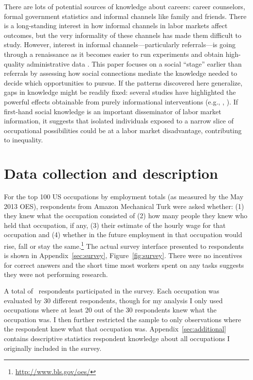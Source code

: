 \documentclass[12pt]{article}
\begin{document}
There are lots of potential sources of knowledge about careers: career counselors, formal government statistics and informal channels like family and friends. 
There is a long-standing interest in how informal channels in labor markets affect outcomes\citep{rees1966information, stigler1962information}, but the very informality of these channels has made them difficult to study. 
However, interest in informal channels---particularly referrals---is going through a renaissance as it becomes easier to run experiments \citep{pallais2013referential} and obtain high-quality administrative data \citep{burks2013value}.   
This paper focuses on a social ``stage'' earlier than referrals by assessing how social connections mediate the knowledge needed to decide which opportunities to pursue.  
If the patterns discovered here generalize, gaps in knowledge might be readily fixed: 
several studies have highlighted the powerful effects obtainable from purely informational interventions (e.g., \cite{dupas2009teenagers}, \cite{card2010inequality}).
If first-hand social knowledge is an important disseminator of labor market information, it suggests that isolated individuals exposed to a narrow slice of occupational possibilities could be at a labor market disadvantage, contributing to inequality. 


\section{Data collection and description} 
For the top 100 US occupations by employment totals (as measured by the May 2013 OES), respondents from Amazon Mechanical Turk were asked whether: 
(1) they knew what the occupation consisted of 
(2) how many people they knew who held that occupation, if any,  
(3) their estimate of the hourly wage for that occupation
and (4) whether in the future employment in that occupation would rise, fall or stay the same.\footnote{\url{http://www.bls.gov/oes/}} 
The actual survey interface presented to respondents is shown in Appendix~\ref{sec:survey}, Figure~\ref{fig:survey}. 
There were no incentives for correct answers and the short time most workers spent on any tasks suggests they were not performing research. 

A total of \numRaters\, respondents participated in the survey. 
Each occupation was evaluated by 30 different respondents, though for my analysis I only used occupations where at least 20 out of the 30 respondents knew what the occupation was.
I then further restricted the sample to only observations where the respondent knew what that occupation was. 
Appendix~\ref{sec:additional} contains descriptive statistics respondent knowledge about all occupations I originally included in the survey.   
\end{document}
